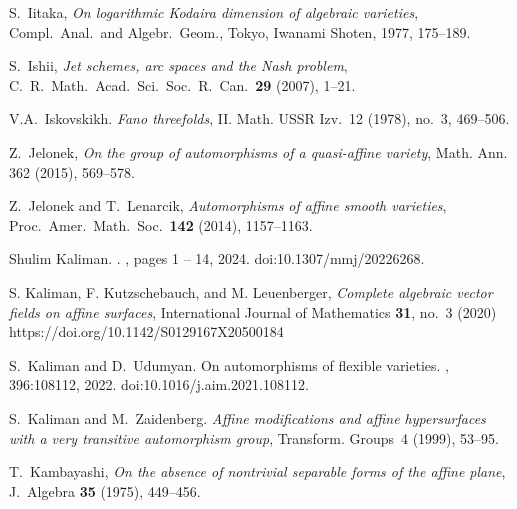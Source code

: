 S.~Iitaka,
\emph{On logarithmic Kodaira dimension of
algebraic varieties}, Compl.\ Anal.\ and Algebr.\ Geom.,
Tokyo, Iwanami Shoten, 1977, 175--189.




S.~Ishii, \emph{Jet schemes, arc spaces and the Nash problem}, C.\ R.\ Math.\ Acad.\ Sci.\ Soc.\
R.\ Can.\ \textbf{29} (2007), 1--21.

V.A.~Iskovskikh. \emph{Fano threefolds}, II.
Math. USSR Izv.~12 (1978), no.~3, 469--506.

Z.~Jelonek,
 \emph{On the group of automorphisms of a quasi-affine variety},
Math. Ann. 362  (2015), 569--578.

Z.~Jelonek and T.~Lenarcik,
 \emph{Automorphisms of affine smooth varieties},
Proc.\ Amer.\ Math.\ Soc.\ \textbf{142} (2014), 1157--1163.

Shulim Kaliman.
.
, pages 1 -- 14, 2024.
\newblock doi:10.1307/mmj/20226268.

S. Kaliman, F. Kutzschebauch, and M. Leuenberger, \emph{Complete algebraic vector fields on affine surfaces},
International Journal of Mathematics \textbf{31}, no.~3 (2020)
https://doi.org/10.1142/S0129167X20500184

S.~Kaliman and D.~Udumyan.
\newblock On automorphisms of flexible varieties.
, 396:108112, 2022.
\newblock doi:10.1016/j.aim.2021.108112.

S.~Kaliman and M.~Zaidenberg.
\emph{Affine modifications and affine
hypersurfaces with a very transitive automorphism group}, Transform. Groups~4 (1999), 53--95.

T.~Kambayashi, \emph{
On the absence of nontrivial separable forms of the affine plane},
J.\ Algebra \textbf{35} (1975), 449--456.

